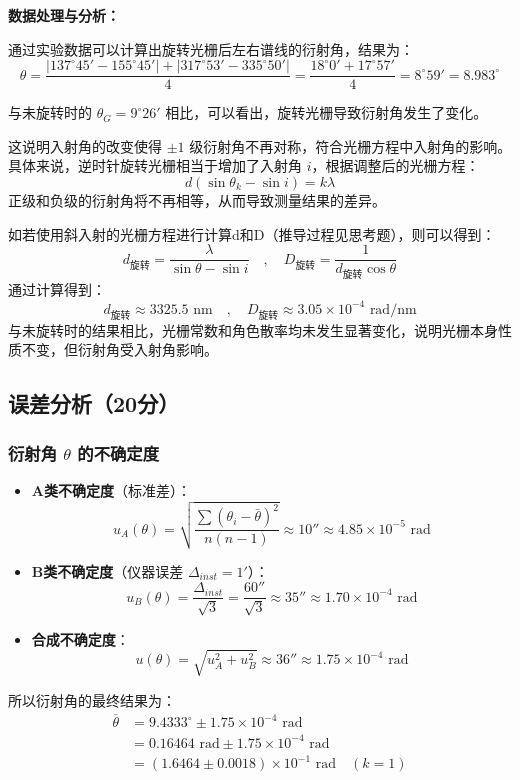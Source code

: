 \documentclass[]{../../templates/Report}%
\begin{document}
\begin{fullreportonly}
\textbf{数据处理与分析：}

通过实验数据可以计算出旋转光栅后左右谱线的衍射角，结果为：
\[
    \theta = \frac{|137^\circ 45' - 155^\circ 45'| + |317^\circ 53' - 335^\circ 50'|}{4} = \frac{18^\circ 0' + 17^\circ 57'}{4} = 8^\circ 59' = 8.983^\circ
\]

与未旋转时的 $\theta_G = 9^\circ 26'$ 相比，可以看出，旋转光栅导致衍射角发生了变化。

这说明入射角的改变使得 $\pm 1$ 级衍射角不再对称，符合光栅方程中入射角的影响。具体来说，逆时针旋转光栅相当于增加了入射角 $i$，根据调整后的光栅方程：
\[
d(\sin \theta_k - \sin i) = k\lambda
\]
正级和负级的衍射角将不再相等，从而导致测量结果的差异。

如若使用斜入射的光栅方程进行计算d和D（推导过程见思考题），则可以得到：
\[
    d_{\text{旋转}} = \frac{\lambda}{\sin \theta-\sin i} \quad , \quad D_{\text{旋转}} = \frac{1}{d_{\text{旋转}} \cos \theta}
\]
通过计算得到：
\[
    d_{\text{旋转}} \approx 3325.5 \text{ nm} \quad , \quad D_{\text{旋转}} \approx 3.05 \times 10^{-4} \text{ rad/nm}
\]
与未旋转时的结果相比，光栅常数和角色散率均未发生显著变化，说明光栅本身性质不变，但衍射角受入射角影响。


\subsection{误差分析（20分）}

\subsubsection{衍射角 $\theta$ 的不确定度}
\begin{itemize}
    \item \textbf{A类不确定度}（标准差）：
    \[
    u_A(\theta) = \sqrt{\frac{\sum (\theta_i - \bar{\theta})^2}{n(n-1)}} \approx 10'' \approx 4.85 \times 10^{-5} \text{ rad}
    \]
    \item \textbf{B类不确定度}（仪器误差 $\Delta_{inst} = 1'$）：
    \[
    u_B(\theta) = \frac{\Delta_{inst}}{\sqrt{3}} = \frac{60''}{\sqrt{3}} \approx 35'' \approx 1.70 \times 10^{-4} \text{ rad}
    \]
    \item \textbf{合成不确定度}：
    \[
    u(\theta) = \sqrt{u_A^2 + u_B^2} \approx 36'' \approx 1.75 \times 10^{-4} \text{ rad}
    \]
\end{itemize}

所以衍射角的最终结果为：
\begin{align*}
\overline{\theta} &= 9.4333^\circ \pm  1.75 \times 10^{-4} \text{ rad}  \\
 &= 0.16464 \text{ rad} \pm 1.75 \times 10^{-4} \text{ rad} \\
 &= (1.6464 \pm 0.0018)\times 10^{-1} \text{ rad} \quad (k=1)
\end{align*}

\end{fullreportonly}
\end{document}
